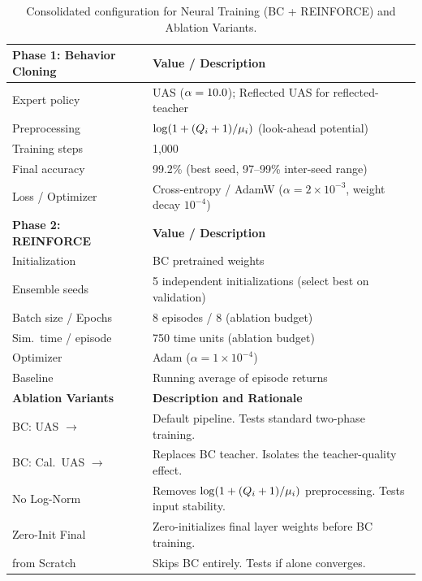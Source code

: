 \begin{table}[htbp]
\centering
\small
\caption{Consolidated configuration for Neural Training (BC + REINFORCE) and Ablation Variants.}
\label{tab:unified_training_config}
\renewcommand{\arraystretch}{1.25}
\begin{tabular}{@{\hspace{6pt}}l @{\hspace{20pt}} p{8.5cm}@{\hspace{6pt}}}
\toprule
\textbf{Phase 1: Behavior Cloning} & \textbf{Value / Description} \\
\midrule
Expert policy         & UAS ($\alpha = 10.0$); Reflected UAS for reflected-teacher \\
Preprocessing         & $\log(1 + (Q_{i}+1)/\mu_i)$ (look-ahead potential) \\
Training steps        & 1{,}000 \\
Final accuracy        & 99.2\% (best seed, 97--99\% inter-seed range) \\
Loss / Optimizer      & Cross-entropy / AdamW ($\alpha = 2 \times 10^{-3}$, weight decay $10^{-4}$) \\
\midrule
\textbf{Phase 2: REINFORCE} & \textbf{Value / Description} \\
\midrule
Initialization        & BC pretrained weights \\
Ensemble seeds        & 5 independent initializations (select best on validation) \\
Batch size / Epochs   & 8 episodes / 8 (ablation budget) \\
Sim.\ time / episode  & 750 time units (ablation budget) \\
Optimizer             & Adam ($\alpha = 1 \times 10^{-4}$) \\
Baseline              & Running average of episode returns \\
\midrule
\textbf{Ablation Variants} & \textbf{Description and Rationale} \\
\midrule
BC: UAS $\to$ \reinforce{} & Default pipeline. Tests standard two-phase training. \\
\addlinespace[3pt]
BC: Cal.\ UAS $\to$ \reinforce{} & Replaces BC teacher. Isolates the teacher-quality effect. \\
\addlinespace[3pt]
No Log-Norm           & Removes $\log(1 + (Q_{i}+1)/\mu_i)$ preprocessing. Tests input stability. \\
\addlinespace[3pt]
Zero-Init Final       & Zero-initializes final layer weights before BC training. \\
\addlinespace[3pt]
\reinforce{} from Scratch & Skips BC entirely. Tests if \reinforce{} alone converges. \\
\bottomrule
\end{tabular}
\end{table}

